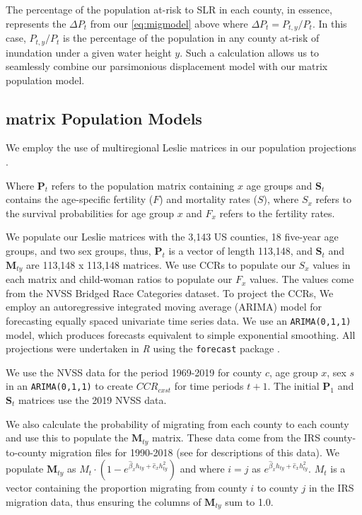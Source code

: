 \documentclass[12pt]{article}
\begin{document}
The percentage of the population at-risk to SLR in each county, in
essence, represents the \(\Delta P_t\) from our \autoref{eq:migmodel}
above where \(\Delta P_t = P_{t,y}/P_t\). In this case, \(P_{t,y}/P_t\)
is the percentage of the population in any county at-risk of inundation
under a given water height \(y\). Such a calculation allows us to
seamlessly combine our parsimonious displacement model with our matrix
population model.

\hypertarget{matrix-population-models}{%
\subsection{matrix Population Models}\label{matrix-population-models}}

We employ the use of multiregional Leslie matrices in our population
projections \citep{rogers1966multiregional}.

Where \(\mathbf{P}_t\) refers to the population matrix containing \(x\)
age groups and \(\mathbf{S}_t\) contains the age-specific fertility
(\(F\)) and mortality rates (\(S\)), where \(S_x\) refers to the
survival probabilities for age group \(x\) and \(F_x\) refers to the
fertility rates.

We populate our Leslie matrices with the 3,143 US counties, 18 five-year
age groups, and two sex groups, thus, \(\mathbf{P}_t\) is a vector of
length 113,148, and \(\mathbf{S}_t\) and \(\mathbf{M}_{ty}\) are 113,148
x 113,148 matrices. We use CCRs to populate our \(S_x\) values in each
matrix and child-woman ratios to populate our \(F_x\) values. The values
come from the NVSS Bridged Race Categories dataset. To project the CCRs,
We employ an autoregressive integrated moving average (ARIMA) model for
forecasting equally spaced univariate time series data. We use an
\texttt{ARIMA(0,1,1)} model, which produces forecasts equivalent to
simple exponential smoothing. All projections were undertaken in
\textit{R} \citep{rcore} using the \texttt{forecast} package
\citep{Rforecast}.

We use the NVSS data for the period 1969-2019 for county \(c\), age
group \(x\), sex \(s\) in an \texttt{ARIMA(0,1,1)} to create
\(CCR_{cxst}\) for time periods \(t+1\). The initial \(\mathbf{P}_1\)
and \(\mathbf{S}_t\) matrices use the 2019 NVSS data.

We also calculate the probability of migrating from each county to each
county and use this to populate the \(\mathbf{M}_{ty}\) matrix. These
data come from the IRS county-to-county migration files for 1990-2018
(see \citep{hauer2019irs, dewaard2021user} for descriptions of this
data). We populate \(\mathbf{M}_{ty}\) as
\(M_t\cdot(1-e^{\hat\beta_xh_{ty}+\hat c_xh^2_{ty}})\) and where \(i=j\)
as \(e^{\hat\beta_xh_{ty}+\hat c_xh^2_{ty}}\). \(M_t\) is a vector
containing the proportion migrating from county \(i\) to county \(j\) in
the IRS migration data, thus ensuring the columns of \(\mathbf{M}_{ty}\)
sum to 1.0.
\end{document}
